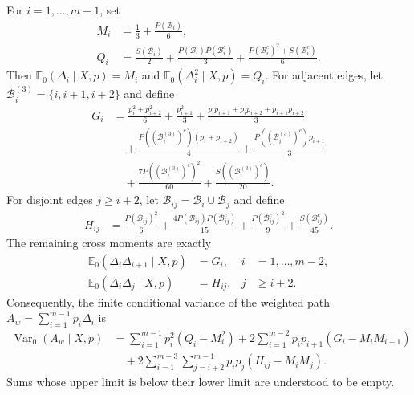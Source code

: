 \begin{proposition}
\label{prop:chatterjee-exact-edge-moments}
For $i=1,\ldots,m-1$, set
\begin{align*}
  M_i
  &=\frac13+\frac{P(\mathcal B_i)}6,\\
  Q_i
  &=\frac{S(\mathcal B_i)}2
    +\frac{P(\mathcal B_i)P(\mathcal B_i^c)}3
    +\frac{P(\mathcal B_i^c)^2+S(\mathcal B_i^c)}6.
\end{align*}
Then $\mathbb E_0(\Delta_i\mid X,p)=M_i$ and
$\mathbb E_0(\Delta_i^2\mid X,p)=Q_i$. For adjacent edges, let
$\mathcal B_i^{(3)}=\{i,i+1,i+2\}$ and define
\begin{align*}
  G_i
  &=\frac{p_i^2+p_{i+2}^2}{6}+\frac{p_{i+1}^2}{3}
    +\frac{p_ip_{i+1}+p_ip_{i+2}+p_{i+1}p_{i+2}}{3}\\
  &\quad
    +\frac{P((\mathcal B_i^{(3)})^c)(p_i+p_{i+2})}{4}
    +\frac{P((\mathcal B_i^{(3)})^c)p_{i+1}}{3}\\
  &\quad
    +\frac{7P((\mathcal B_i^{(3)})^c)^2}{60}
    +\frac{S((\mathcal B_i^{(3)})^c)}{20}.
\end{align*}
For disjoint edges $j\geq i+2$, let
$\mathcal B_{ij}=\mathcal B_i\cup\mathcal B_j$ and define
\begin{align*}
  H_{ij}
  &=\frac{P(\mathcal B_{ij})^2}{6}
    +\frac{4P(\mathcal B_{ij})P(\mathcal B_{ij}^c)}{15}
    +\frac{P(\mathcal B_{ij}^c)^2}{9}
    +\frac{S(\mathcal B_{ij}^c)}{45}.
\end{align*}
The remaining cross moments are exactly
\begin{align*}
  \mathbb E_0(\Delta_i\Delta_{i+1}\mid X,p)
  &=G_i,
  &i&=1,\ldots,m-2,\\
  \mathbb E_0(\Delta_i\Delta_j\mid X,p)
  &=H_{ij},
  &j&\geq i+2.
\end{align*}
Consequently, the finite conditional variance of the weighted path
$A_w=\sum_{i=1}^{m-1}p_i\Delta_i$ is
\begin{align*}
  \operatorname{Var}_0(A_w\mid X,p)
  &=\sum_{i=1}^{m-1}p_i^2(Q_i-M_i^2)
    +2\sum_{i=1}^{m-2}p_ip_{i+1}(G_i-M_iM_{i+1})\\
  &\quad
    +2\sum_{i=1}^{m-3}\sum_{j=i+2}^{m-1}
      p_ip_j(H_{ij}-M_iM_j).
\end{align*}
Sums whose upper limit is below their lower limit are understood to be
empty.
\end{proposition}

